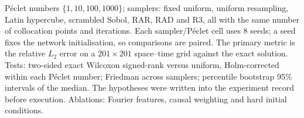 P\'eclet numbers $\{1,10,100,1000\}$; samplers: fixed uniform, uniform resampling, Latin hypercube, scrambled Sobol,
RAR, RAD and R3, all with the same number of collocation points and iterations. Each sampler/P\'eclet cell uses
8 seeds; a seed fixes the network initialisation, so comparisons are paired. The primary metric is the relative
$L_2$ error on a $201\times201$ space--time grid against the exact solution. Tests: two-sided exact Wilcoxon
signed-rank versus uniform, Holm-corrected within each P\'eclet number; Friedman across samplers; percentile
bootstrap 95\% intervals of the median. The hypotheses were written into the experiment record before execution.
Ablations: Fourier features, causal weighting and hard initial conditions.
